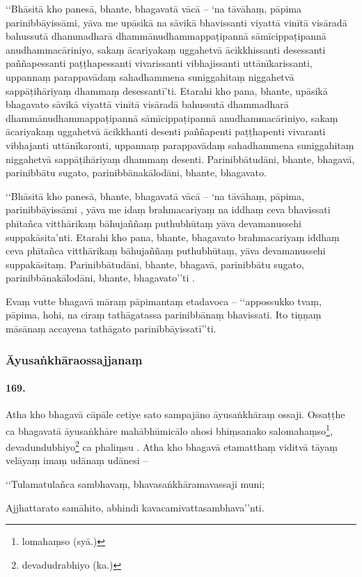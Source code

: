 ‘‘Bhāsitā kho panesā, bhante, bhagavatā vācā – ‘na tāvāhaṃ, pāpima parinibbāyissāmi, yāva me upāsikā na sāvikā bhavissanti viyattā vinītā visāradā bahussutā dhammadharā dhammānudhammappaṭipannā sāmīcippaṭipannā anudhammacāriniyo, sakaṃ ācariyakaṃ uggahetvā ācikkhissanti desessanti paññapessanti paṭṭhapessanti vivarissanti vibhajissanti uttānīkarissanti, uppannaṃ parappavādaṃ sahadhammena suniggahitaṃ niggahetvā sappāṭihāriyaṃ dhammaṃ desessantī’ti. Etarahi kho pana, bhante, upāsikā bhagavato sāvikā viyattā vinītā visāradā bahussutā dhammadharā dhammānudhammappaṭipannā sāmīcippaṭipannā anudhammacāriniyo, sakaṃ ācariyakaṃ uggahetvā ācikkhanti desenti paññapenti paṭṭhapenti vivaranti vibhajanti uttānīkaronti, uppannaṃ parappavādaṃ sahadhammena suniggahitaṃ niggahetvā sappāṭihāriyaṃ dhammaṃ desenti. Parinibbātudāni, bhante, bhagavā, parinibbātu sugato, parinibbānakālodāni, bhante, bhagavato.

‘‘Bhāsitā kho panesā, bhante, bhagavatā vācā – ‘na tāvāhaṃ, pāpima, parinibbāyissāmi , yāva me idaṃ brahmacariyaṃ na iddhaṃ ceva bhavissati phītañca vitthārikaṃ bāhujaññaṃ puthubhūtaṃ yāva devamanussehi suppakāsita’nti. Etarahi kho pana, bhante, bhagavato brahmacariyaṃ iddhaṃ ceva phītañca vitthārikaṃ bāhujaññaṃ puthubhūtaṃ, yāva devamanussehi suppakāsitaṃ. Parinibbātudāni, bhante, bhagavā, parinibbātu sugato, parinibbānakālodāni, bhante, bhagavato’’ti .

Evaṃ vutte bhagavā māraṃ pāpimantaṃ etadavoca – ‘‘appossukko tvaṃ, pāpima, hohi, na ciraṃ tathāgatassa parinibbānaṃ bhavissati. Ito tiṇṇaṃ māsānaṃ accayena tathāgato parinibbāyissatī’’ti.

\subsubsection{Āyusaṅkhāraossajjanaṃ}

\paragraph{169.} Atha kho bhagavā cāpāle cetiye sato sampajāno āyusaṅkhāraṃ ossaji. Ossaṭṭhe ca bhagavatā āyusaṅkhāre mahābhūmicālo ahosi bhiṃsanako salomahaṃso\footnote{lomahaṃso (syā.)}, devadundubhiyo\footnote{devadudrabhiyo (ka.)} ca phaliṃsu . Atha kho bhagavā etamatthaṃ viditvā tāyaṃ velāyaṃ imaṃ udānaṃ udānesi –

‘‘Tulamatulañca sambhavaṃ, bhavasaṅkhāramavassaji muni;

Ajjhattarato samāhito, abhindi kavacamivattasambhava’’nti.

